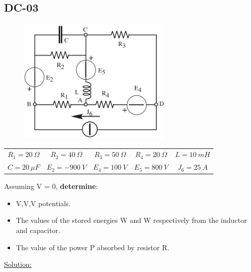 \subsection{DC-03}
\begin{figure}[h]
\includegraphics[height=6cm]{img/1/03.png}
\centering
\end{figure}
\begin{center}
\begin{tabular}{ c c c c c}
  $R_1 = 20 \ \Omega$ & $R_2 = 40 \ \Omega$ & $R_3 = 50 \ \Omega$ & $R_4 = 20 \ \Omega$ & $L = 10 \ mH$\\
  $C = 20\ \mu F $ & $E_2 = -900\ V$ & $E_4 = 100\ V $& $E_5 = 800\ V$ & $J_6 = 25\ A$ \\
\end{tabular}
\end{center}
Assuming V = 0, \textbf{determine}:
\begin{itemize}
  \item V,V,V potentials.
  \item The values of the stored energies W and W respectively from the inductor and capacitor. 
  \item The value of the power P absorbed by resistor R. 
\end{itemize}
\underline{\large{Solution:}}
\vspace{0.2cm}

